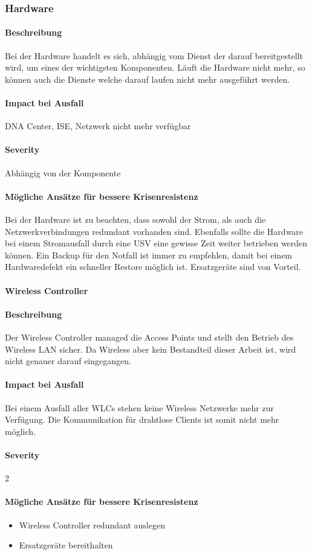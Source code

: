 \subsubsection{Hardware}
\paragraph{Beschreibung}
Bei der Hardware handelt es sich, abhängig vom Dienst der darauf bereitgestellt wird, um eines der wichtigsten Komponenten. Läuft die Hardware nicht mehr, so können auch die Dienste welche darauf laufen nicht mehr ausgeführt werden. 

\paragraph{Impact bei Ausfall}
DNA Center, ISE, Netzwerk nicht mehr verfügbar

\paragraph{Severity} Abhängig von der Komponente

\paragraph{Mögliche Ansätze für bessere Krisenresistenz}
Bei der Hardware ist zu beachten, dass sowohl der Strom, als auch die Netzwerkverbindungen redundant vorhanden sind. Ebenfalls sollte die Hardware bei einem Stromausfall durch eine USV eine gewisse Zeit weiter betrieben werden können. Ein Backup für den Notfall ist immer zu empfehlen, damit bei einem Hardwaredefekt ein schneller Restore möglich ist. Ersatzgeräte sind von Vorteil.

\paragraph{Wireless Controller}
\paragraph{Beschreibung}
Der Wireless Controller managed die Access Points und stellt den Betrieb des Wireless LAN sicher. Da Wireless aber kein Bestandteil dieser Arbeit ist, wird nicht genauer darauf eingegangen.

\paragraph{Impact bei Ausfall}
Bei einem Ausfall aller WLCs stehen keine Wireless Netzwerke mehr zur Verfügung. Die Kommunikation für drahtlose Clients ist somit nicht mehr möglich.

\paragraph{Severity} 2

\paragraph{Mögliche Ansätze für bessere Krisenresistenz}
\begin{itemize}
	\item Wireless Controller redundant auslegen
	\item Ersatzgeräte bereithalten
\end{itemize}
